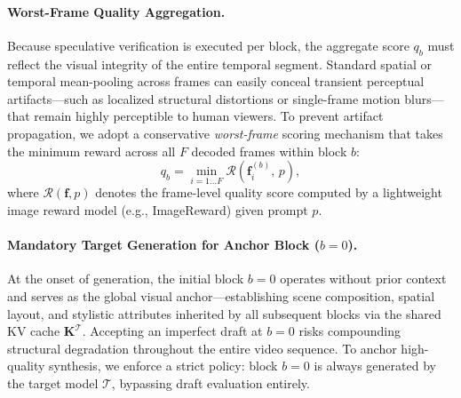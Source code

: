 \documentclass{article} %
\newcommand{\Target}{\mathcal{T}}
\newcommand{\score}{q}
\begin{document}
\paragraph{Worst-Frame Quality Aggregation.}
Because speculative verification is executed per block, the aggregate score $\score_b$ must reflect the visual integrity of the entire temporal segment. Standard spatial or temporal mean-pooling across frames can easily conceal transient perceptual artifacts—such as localized structural distortions or single-frame motion blurs—that remain highly perceptible to human viewers. To prevent artifact propagation, we adopt a conservative \emph{worst-frame} scoring mechanism that takes the minimum reward across all $F$ decoded frames within block $b$:
\begin{equation}
  \score_b = \min_{i=1 \dots F} \mathcal{R}\!\left(\mathbf{f}^{(b)}_i,\, p\right),
  \label{eq:minscore}
\end{equation}
where $\mathcal{R}(\mathbf{f}, p)$ denotes the frame-level quality score computed by a lightweight image reward model (e.g., ImageReward) given prompt $p$.

\paragraph{Mandatory Target Generation for Anchor Block ($b=0$).}
At the onset of generation, the initial block $b=0$ operates without prior context and serves as the global visual anchor—establishing scene composition, spatial layout, and stylistic attributes inherited by all subsequent blocks via the shared KV cache $\mathbf{K}^{\mathcal{T}}$. Accepting an imperfect draft at $b=0$ risks compounding structural degradation throughout the entire video sequence. To anchor high-quality synthesis, we enforce a strict policy: block $b=0$ is always generated by the target model $\mathcal{T}$, bypassing draft evaluation entirely.










\end{document}
